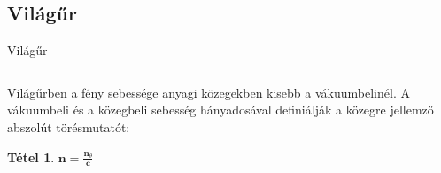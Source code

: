 \documentclass[aspectratio=169,12pt,xcolor={table},compress]{beamer}
\newtheorem{tet1}{Tétel}
\newcommand{\no}[1]{\mathbf{n}_{#1}}
\newcommand{\n}{\mathbf{n}}
\newcommand{\co}{\mathbf{c}}
\begin{document}
\subsection{Világűr}
\begin{frame}{Világűr}
\begin{columns}[c]
\begin{column}{.5\linewidth}
\newdimen\behuzas
{}
\hspace{\behuzas}Világűrben a fény sebessége anyagi közegekben kisebb a vákuumbelinél. A vákuumbeli és a közegbeli sebesség hányadosával definiálják a közegre jellemző abszolút törésmutatót:
\begin{tet1}
$\n=\frac{\no{\theta}}{\co}$
\end{tet1}
\end{column}
\begin{column}{.5\linewidth}
\begin{center}
\end{center}
\end{column}
\end{columns}
\end{frame}
\end{document}
